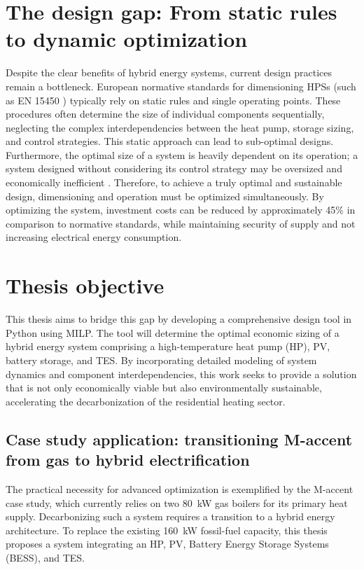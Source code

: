 \documentclass[11pt,a4paper]{report}
\begin{document}
                            
                    



\section{The design gap: From static rules to dynamic optimization}
Despite the clear benefits of hybrid energy systems, current design practices remain a bottleneck.
European normative standards for dimensioning HPSs (such as EN 15450 \cite{EN15450_2007}) typically rely on static rules and single operating points.
These procedures often determine the size of individual components sequentially, neglecting the complex interdependencies between the heat pump, storage sizing, and control strategies.
This static approach can lead to sub-optimal designs.
Furthermore, the optimal size of a system is heavily dependent on its operation; a system designed without considering its control strategy may be oversized and economically inefficient \cite{Dongellini2017}.
Therefore, to achieve a truly optimal and sustainable design, dimensioning and operation must be optimized simultaneously.  By optimizing
the system, investment costs can be reduced by approximately 45\% in comparison to normative standards,
while maintaining security of supply and not increasing electrical energy consumption\cite{Krutzfeldt2021}.



\section{Thesis objective}
This thesis aims to bridge this gap by developing a comprehensive design tool in Python using MILP.
The tool will determine the optimal economic sizing of a hybrid energy system comprising a high-temperature heat pump (HP), PV, battery storage, and TES.
By incorporating detailed modeling of system dynamics and component interdependencies, this work seeks to provide a solution that is not only economically viable but also environmentally sustainable, accelerating the decarbonization of the residential heating sector.

\subsection{Case study application: transitioning M-accent from gas to hybrid electrification}

The practical necessity for advanced optimization is exemplified by the M-accent case study, which currently relies on two 80~kW gas boilers for its primary heat supply. Decarbonizing such a system requires a transition to a hybrid energy architecture. To replace the existing 160~kW fossil-fuel capacity, this thesis proposes a system integrating an HP, PV, Battery Energy Storage Systems (BESS), and TES.
\end{document}
